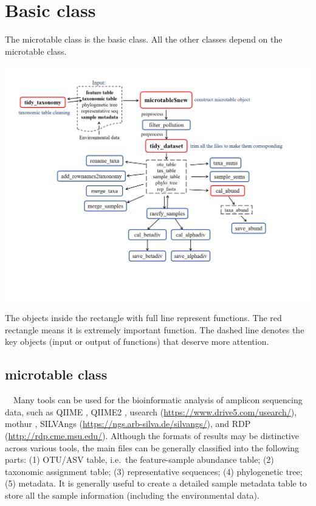 \documentclass[
]{book}
\begin{document}
\hypertarget{basic-class}{%
\chapter{Basic class}\label{basic-class}}

The microtable class is the basic class.
All the other classes depend on the microtable class.

\begin{center}\includegraphics[width=8000px]{Images/microtable_framework} \end{center}

The objects inside the rectangle with full line represent functions.
The red rectangle means it is extremely important function.
The dashed line denotes the key objects (input or output of functions) that deserve more attention.

\hypertarget{microtable-class}{%
\section{microtable class}\label{microtable-class}}

　Many tools can be used for the bioinformatic analysis of amplicon sequencing data, such as QIIME \citep{Caporaso_QIIME_2010}, QIIME2 \citep{Bolyen_Reproducible_2019},
usearch (\url{https://www.drive5.com/usearch/}), mothur \citep{Schloss_Introducing_2009},
SILVAngs (\url{https://ngs.arb-silva.de/silvangs/}),
and RDP (\url{http://rdp.cme.msu.edu/}).
Although the formats of results may be distinctive across various tools, the main files can be generally classified into the following parts:
(1) OTU/ASV table, i.e.~the feature-sample abundance table;
(2) taxonomic assignment table;
(3) representative sequences;
(4) phylogenetic tree;
(5) metadata. It is generally useful to create a detailed sample metadata table to store all the sample information (including the environmental data).
\end{document}
